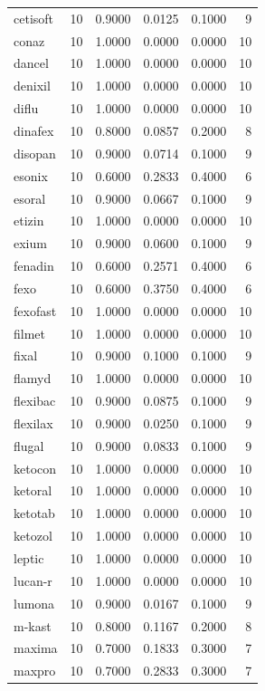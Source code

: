 \begin{longtable}{p{3.0cm}rrrrr}
cetisoft & 10 & 0.9000 & 0.0125 & 0.1000 & 9 \\
conaz & 10 & 1.0000 & 0.0000 & 0.0000 & 10 \\
dancel & 10 & 1.0000 & 0.0000 & 0.0000 & 10 \\
denixil & 10 & 1.0000 & 0.0000 & 0.0000 & 10 \\
diflu & 10 & 1.0000 & 0.0000 & 0.0000 & 10 \\
dinafex & 10 & 0.8000 & 0.0857 & 0.2000 & 8 \\
disopan & 10 & 0.9000 & 0.0714 & 0.1000 & 9 \\
esonix & 10 & 0.6000 & 0.2833 & 0.4000 & 6 \\
esoral & 10 & 0.9000 & 0.0667 & 0.1000 & 9 \\
etizin & 10 & 1.0000 & 0.0000 & 0.0000 & 10 \\
exium & 10 & 0.9000 & 0.0600 & 0.1000 & 9 \\
fenadin & 10 & 0.6000 & 0.2571 & 0.4000 & 6 \\
fexo & 10 & 0.6000 & 0.3750 & 0.4000 & 6 \\
fexofast & 10 & 1.0000 & 0.0000 & 0.0000 & 10 \\
filmet & 10 & 1.0000 & 0.0000 & 0.0000 & 10 \\
fixal & 10 & 0.9000 & 0.1000 & 0.1000 & 9 \\
flamyd & 10 & 1.0000 & 0.0000 & 0.0000 & 10 \\
flexibac & 10 & 0.9000 & 0.0875 & 0.1000 & 9 \\
flexilax & 10 & 0.9000 & 0.0250 & 0.1000 & 9 \\
flugal & 10 & 0.9000 & 0.0833 & 0.1000 & 9 \\
ketocon & 10 & 1.0000 & 0.0000 & 0.0000 & 10 \\
ketoral & 10 & 1.0000 & 0.0000 & 0.0000 & 10 \\
ketotab & 10 & 1.0000 & 0.0000 & 0.0000 & 10 \\
ketozol & 10 & 1.0000 & 0.0000 & 0.0000 & 10 \\
leptic & 10 & 1.0000 & 0.0000 & 0.0000 & 10 \\
lucan-r & 10 & 1.0000 & 0.0000 & 0.0000 & 10 \\
lumona & 10 & 0.9000 & 0.0167 & 0.1000 & 9 \\
m-kast & 10 & 0.8000 & 0.1167 & 0.2000 & 8 \\
maxima & 10 & 0.7000 & 0.1833 & 0.3000 & 7 \\
maxpro & 10 & 0.7000 & 0.2833 & 0.3000 & 7 \\

\end{longtable}
